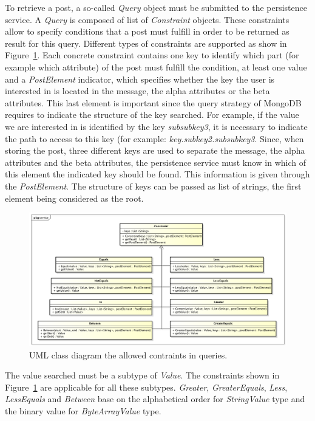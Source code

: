 \documentclass[oneside]{scrreprt}
\newcommand{\fig}[1]{Figure~\ref{#1}}
\begin{document}
To retrieve a post, a so-called \emph{Query} object must be submitted to the persistence service. A \emph{Query} is composed of list of \emph{Constraint} objects. These constraints allow to specify conditions that a post must fulfill in order to be returned as result for this query. Different types of constraints are supported as show in \fig{fig:constraints}. Each concrete constraint contains one key to identify which part (for example which attribute) of the post must fulfill the condition, at least one value and a \emph{PostElement} indicator, which specifies whether the key the user is interested in is located in the message, the alpha attributes or the beta attributes. This last element is important since the query strategy of MongoDB requires to indicate the structure of the key searched. For example, if the value we are interested in is identified by the key \emph{subsubkey3}, it is necessary to indicate the path to access to this key (for example: \emph{key.subkey2.subsubkey3}. Since, when storing the post, three different keys are used to separate the message, the alpha attributes and the beta attributes, the persistence service must know in which of this element the indicated key should be found. This information is given through the \emph{PostElement}. The structure of keys can be passed as list of strings, the first element being considered as the root.

\begin{figure}[ht]
\centerline{
\includegraphics[width=1.0\textwidth]{figs/constraints}}
\caption{UML class diagram the allowed contraints in queries.}
\label{fig:constraints}
\end{figure}

The value searched must be a subtype of \emph{Value}. The constraints shown in \fig{fig:constraints} are applicable for all these subtypes. \emph{Greater}, \emph{GreaterEquals}, \emph{Less}, \emph{LessEquals} and \emph{Between} base on the alphabetical order for \emph{StringValue} type and the binary value for \emph{ByteArrayValue} type.
\end{document}
